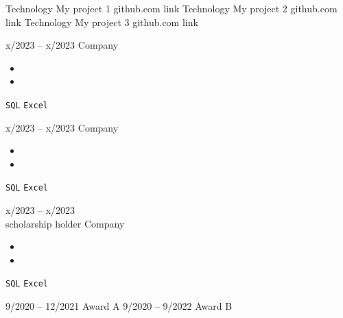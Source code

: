 \documentclass[9pt]{developercv} %
\begin{document}
\vspace{-10 pt}
\begin{entrylist}
    \entry
		{Technology}
		{My project 1}
		{github.com link}
		{%
        \lipsum[1][1-3]}
    \entry
		{Technology}
		{My project 2}
		{github.com link}
		{%
        \lipsum[1][1-3]}
	\entry
		{Technology}
		{My project 3}
		{github.com link}
		{%
        \lipsum[1][1-3]}
\end{entrylist}



\vspace{-10 pt}
\begin{entrylist}
	\entry
        {x/2023 -- x/2023}
		{\lipsum[1][1]}
		{Company}
		{\vspace{-10pt}
        \begin{itemize}[noitemsep,topsep=0pt,parsep=0pt,partopsep=0pt, leftmargin=-1pt]
            \item \lipsum[1][1-2]
            \item \lipsum[1][3-4]
        \end{itemize} 
        \texttt{SQL} \slashsep \texttt{Excel}}
	\entry
		{x/2023 -- x/2023}
		{\lipsum[1][1]}
		{Company}
		{\vspace{-10pt}
        \begin{itemize}[noitemsep,topsep=0pt,parsep=0pt,partopsep=0pt, leftmargin=-1pt]
            \item \lipsum[1][1-2]
            \item \lipsum[1][3-4]
        \end{itemize} 
        \texttt{SQL} \slashsep \texttt{Excel}}
	\entry
		{x/2023 -- x/2023 \\\footnotesize{scholarship holder}}
		{\lipsum[1][1]}
		{Company}
		{\vspace{-10pt}
        \begin{itemize}[noitemsep,topsep=0pt,parsep=0pt,partopsep=0pt, leftmargin=-1pt]
            \item \lipsum[1][1-2]
            \item \lipsum[1][3-4]
        \end{itemize} 
        \texttt{SQL} \slashsep \texttt{Excel}}
\end{entrylist}

\vspace{-10 pt}
\begin{entrylist}
	\entry
		{9/2020 -- 12/2021}
		{Award A}
		{}
		{\lipsum[1][1]}
	\entry
		{9/2020 -- 9/2022}
		{Award B}
		{}
		{\lipsum[1][1]}

\end{entrylist}
\end{document}

